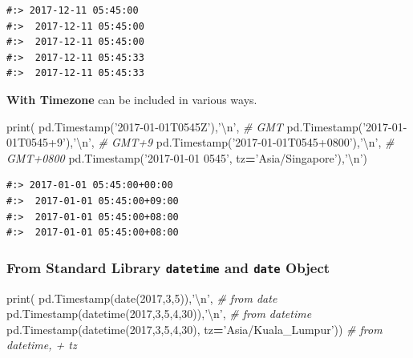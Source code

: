 \documentclass[
]{book}
\newenvironment{Shaded}{\begin{snugshade}}{\end{snugshade}}
\newcommand{\BuiltInTok}[1]{#1}
\newcommand{\CharTok}[1]{\textcolor[rgb]{0.5,0.5,0.5}{#1}}
\newcommand{\CommentTok}[1]{\textcolor[rgb]{0.37,0.37,0.37}{\textit{#1}}}
\newcommand{\DecValTok}[1]{\textcolor[rgb]{0.06,0.06,0.06}{#1}}
\newcommand{\NormalTok}[1]{#1}
\newcommand{\OperatorTok}[1]{\textcolor[rgb]{0.43,0.43,0.43}{\textbf{#1}}}
\newcommand{\StringTok}[1]{\textcolor[rgb]{0.5,0.5,0.5}{#1}}
\begin{document}
\begin{verbatim}
#:> 2017-12-11 05:45:00 
#:>  2017-12-11 05:45:00 
#:>  2017-12-11 05:45:00 
#:>  2017-12-11 05:45:33 
#:>  2017-12-11 05:45:33
\end{verbatim}

\textbf{With Timezone} can be included in various ways.

\begin{Shaded}
\begin{Highlighting}[]
\BuiltInTok{print}\NormalTok{( pd.Timestamp(}\StringTok{'2017-01-01T0545Z'}\NormalTok{),}\StringTok{'}\CharTok{\textbackslash{}n}\StringTok{'}\NormalTok{,  }\CommentTok{# GMT }
\NormalTok{       pd.Timestamp(}\StringTok{'2017-01-01T0545+9'}\NormalTok{),}\StringTok{'}\CharTok{\textbackslash{}n}\StringTok{'}\NormalTok{, }\CommentTok{# GMT+9}
\NormalTok{       pd.Timestamp(}\StringTok{'2017-01-01T0545+0800'}\NormalTok{),}\StringTok{'}\CharTok{\textbackslash{}n}\StringTok{'}\NormalTok{,   }\CommentTok{# GMT+0800}
\NormalTok{       pd.Timestamp(}\StringTok{'2017-01-01 0545'}\NormalTok{, tz}\OperatorTok{=}\StringTok{'Asia/Singapore'}\NormalTok{),}\StringTok{'}\CharTok{\textbackslash{}n}\StringTok{'}\NormalTok{)}
\end{Highlighting}
\end{Shaded}

\begin{verbatim}
#:> 2017-01-01 05:45:00+00:00 
#:>  2017-01-01 05:45:00+09:00 
#:>  2017-01-01 05:45:00+08:00 
#:>  2017-01-01 05:45:00+08:00
\end{verbatim}

\hypertarget{from-standard-library-datetime-and-date-object}{%
\subsubsection{\texorpdfstring{From Standard Library \texttt{datetime} and \texttt{date} Object}{From Standard Library datetime and date Object}}\label{from-standard-library-datetime-and-date-object}}

\begin{Shaded}
\begin{Highlighting}[]
\BuiltInTok{print}\NormalTok{( pd.Timestamp(date(}\DecValTok{2017}\NormalTok{,}\DecValTok{3}\NormalTok{,}\DecValTok{5}\NormalTok{)),}\StringTok{'}\CharTok{\textbackslash{}n}\StringTok{'}\NormalTok{,           }\CommentTok{# from date}
\NormalTok{       pd.Timestamp(datetime(}\DecValTok{2017}\NormalTok{,}\DecValTok{3}\NormalTok{,}\DecValTok{5}\NormalTok{,}\DecValTok{4}\NormalTok{,}\DecValTok{30}\NormalTok{)),}\StringTok{'}\CharTok{\textbackslash{}n}\StringTok{'}\NormalTok{,  }\CommentTok{# from datetime}
\NormalTok{       pd.Timestamp(datetime(}\DecValTok{2017}\NormalTok{,}\DecValTok{3}\NormalTok{,}\DecValTok{5}\NormalTok{,}\DecValTok{4}\NormalTok{,}\DecValTok{30}\NormalTok{), tz}\OperatorTok{=}\StringTok{'Asia/Kuala_Lumpur'}\NormalTok{)) }\CommentTok{# from datetime, + tz}
\end{Highlighting}
\end{Shaded}
\end{document}
